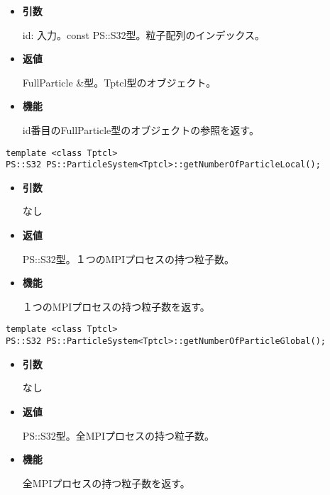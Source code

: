 \begin{itemize}

\item {\bf 引数}

id: 入力。const PS::S32型。粒子配列のインデックス。

\item {\bf 返値}

FullParticle \&型。Tptcl型のオブジェクト。

\item {\bf 機能}

id番目のFullParticle型のオブジェクトの参照を返す。

\end{itemize}




\begin{screen}
\begin{verbatim}
template <class Tptcl>
PS::S32 PS::ParticleSystem<Tptcl>::getNumberOfParticleLocal();
\end{verbatim}
\end{screen}

\begin{itemize}

\item {\bf 引数}

なし

\item {\bf 返値}

PS::S32型。１つのMPIプロセスの持つ粒子数。

\item {\bf 機能}

１つのMPIプロセスの持つ粒子数を返す。

\end{itemize}


\begin{screen}
\begin{verbatim}
template <class Tptcl>
PS::S32 PS::ParticleSystem<Tptcl>::getNumberOfParticleGlobal();
\end{verbatim}
\end{screen}

\begin{itemize}

\item {\bf 引数}

なし

\item {\bf 返値}

PS::S32型。全MPIプロセスの持つ粒子数。

\item {\bf 機能}

全MPIプロセスの持つ粒子数を返す。

\end{itemize}

